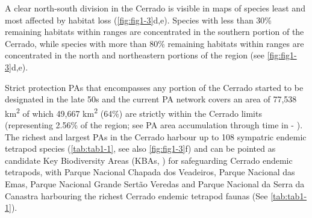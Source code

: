 \documentclass[12pt,openright,oneside,a4paper,english]{abntex2}
\begin{document}
A clear north-south division in the Cerrado is visible in maps of species least and most affected by habitat loss (\autoref{fig:fig1-3}d,e). Species with less than 30\% remaining habitats within ranges are concentrated in the southern portion of the Cerrado, while species with more than 80\% remaining habitats within ranges are concentrated in the north and northeastern portions of the region (see \autoref{fig:fig1-3}d,e).



Strict protection PAs that encompasses any portion of the Cerrado started to be designated in the late 50s and the current PA network covers an area of 77,538 km\textsuperscript{2} of which 49,667 km\textsuperscript{2} (64\%) are strictly within the Cerrado limits (representing 2.56\% of the region; see PA area accumulation through time in  - ). The richest and largest PAs in the Cerrado harbour up to 108 sympatric endemic tetrapod species (\autoref{tab:tab1-1}, see also \autoref{fig:fig1-3}f) and can be pointed as candidate Key Biodiversity Areas (KBAs, \citealp[see][]{KBAs2022}) for safeguarding Cerrado endemic tetrapods, with Parque Nacional Chapada dos Veadeiros, Parque Nacional das Emas, Parque Nacional Grande Sertão Veredas and Parque Nacional da Serra da Canastra harbouring the richest Cerrado endemic tetrapod faunas (See \autoref{tab:tab1-1}). 
\end{document}
